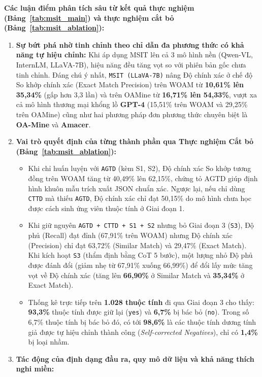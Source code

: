 \documentclass[conference,10pt]{IEEEtran}
\begin{document}
\textbf{Các luận điểm phân tích sâu từ kết quả thực nghiệm (Bảng~\ref{tab:msit_main}) và thực nghiệm cắt bỏ (Bảng~\ref{tab:msit_ablation}):}
\begin{enumerate}
    \item \textbf{Sự bứt phá nhờ tinh chỉnh theo chỉ dẫn đa phương thức có khả năng tự hiệu chỉnh:} Khi áp dụng MSIT lên cả 3 mô hình nền (Qwen-VL, InternLM, LLaVA-7B), hiệu năng đều tăng vọt so với phiên bản gốc chưa tinh chỉnh. Đáng chú ý nhất, \texttt{MSIT (LLaVA-7B)} nâng Độ chính xác ở chế độ So khớp chính xác (Exact Match Precision) trên WOAM từ \textbf{10,61\% lên 35,34\%} (gấp hơn 3,3 lần) và trên OAMine từ \textbf{16,71\% lên 54,33\%}, vượt xa cả mô hình thương mại khổng lồ \textbf{GPT-4} (15,51\% trên WOAM và 29,25\% trên OAMine) cũng như hai phương pháp đơn phương thức chuyên biệt là \textbf{OA-Mine} và \textbf{Amacer}.
    \item \textbf{Vai trò quyết định của từng thành phần qua Thực nghiệm Cắt bỏ (Bảng~\ref{tab:msit_ablation}):}
    \begin{itemize}
        \item Khi chỉ huấn luyện với \texttt{AGTD} (kèm S1, S2), Độ chính xác So khớp tương đồng trên WOAM tăng từ 40,49\% lên 62,15\%, chứng tỏ AGTD giúp định hình khuôn mẫu trích xuất JSON chuẩn xác. Ngược lại, nếu chỉ dùng \texttt{CTTD} mà thiếu \texttt{AGTD}, Độ chính xác chỉ đạt 50,15\% do mô hình chưa học được cách sinh ứng viên thuộc tính ở Giai đoạn 1.
        \item Khi giữ nguyên \texttt{AGTD + CTTD + S1 + S2} nhưng bỏ Giai đoạn 3 (\texttt{S3}), Độ phủ (Recall) đạt đỉnh (67,91\% trên WOAM) nhưng Độ chính xác (Precision) chỉ đạt 63,72\% (Similar Match) và 29,47\% (Exact Match). Khi kích hoạt \texttt{S3} (thẩm định bằng CoT 5 bước), một lượng nhỏ Độ phủ được đánh đổi (giảm nhẹ từ 67,91\% xuống 66,99\%) để đổi lấy mức tăng vọt về Độ chính xác (tăng lên \textbf{66,90\%} ở Similar Match và \textbf{35,34\%} ở Exact Match).
        \item Thống kê trực tiếp trên \textbf{1.028 thuộc tính} đi qua Giai đoạn 3 cho thấy: \textbf{93,3\%} thuộc tính được giữ lại (\texttt{yes}) và \textbf{6,7\%} bị bác bỏ (\texttt{no}). Trong số 6,7\% thuộc tính bị bác bỏ đó, có tới \textbf{98,6\%} là các thuộc tính dương tính giả được tự hiệu chỉnh thành công (\textit{Self-corrected Negatives}), chỉ có \textbf{1,4\%} bị loại nhầm.
    \end{itemize}
    \item \textbf{Tác động của định dạng đầu ra, quy mô dữ liệu và khả năng thích nghi miền:}

\end{enumerate}
\end{document}
